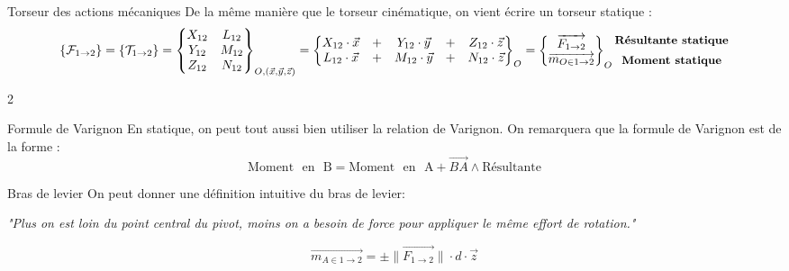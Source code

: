 \documentclass{article} %
\begin{document}
{\begin{definition}{Torseur des actions mécaniques}
De la même manière que le torseur cinématique, on vient écrire un torseur statique :
$$\{\mathcal{F}_{1\to 2}\}=\{\mathcal{T}_{1\to 2}\}=\begin{Bmatrix}
X_{12} & L_{12}  \\
Y_{12} & M_{12} \\
Z_{12} & N_{12} \\
\end{Bmatrix}_{O,(\vec{x},\vec{y},\vec{z})} = \begin{Bmatrix}
X_{12} \cdot \vec{x} &+& Y_{12} \cdot \vec{y} &+& Z_{12} \cdot \vec{z} \\
 L_{12} \cdot \vec{x} &+& M_{12} \cdot \vec{y} &+& N_{12} \cdot \vec{z}  \\
\end{Bmatrix}_O = \begin{Bmatrix}
\overrightarrow{F_{1\to 2}}\\
\overrightarrow{m_{O \in 1\to 2}}\end{Bmatrix}_O \begin{matrix}
\textbf{{\small Résultante statique}}\vspace*{4pt} \\
\textbf{{\small Moment statique}}
\end{matrix}$$
\end{definition}
\begin{multicols}{2}
\begin{propriété}{Formule de Varignon}
En statique, on peut tout aussi bien utiliser la relation de Varignon.
On remarquera que la formule de Varignon est de la forme :
$$\mathrm{Moment\text{ }en\text{ }B}=\mathrm{Moment\text{ }en\text{ }A}+\overrightarrow{BA}\wedge\textrm{Résultante}$$
\end{propriété}
\begin{propriété}{Bras de levier}
On peut donner une définition intuitive du bras de levier:
\begin{center}
\textit{"Plus on est loin du point central du pivot, moins on a besoin de force pour appliquer le même effort de rotation."}
\end{center}
$$\overrightarrow{m_{A \in 1 \to 2}} = \pm \|
\overrightarrow{F_{1 \to 2}} \| \cdot d \cdot \vec{z}$$
\end{propriété}
\end{multicols}
}
\end{document}
